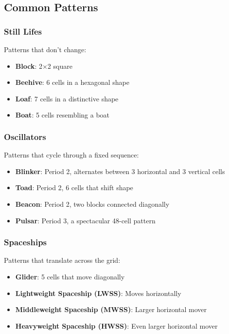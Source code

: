 \documentclass{article}
\begin{document}

\subsection{Common Patterns}

\subsubsection{Still Lifes}
Patterns that don't change:

\begin{itemize}
\item \textbf{Block}: 2×2 square
\item \textbf{Beehive}: 6 cells in a hexagonal shape
\item \textbf{Loaf}: 7 cells in a distinctive shape
\item \textbf{Boat}: 5 cells resembling a boat
\end{itemize}

\subsubsection{Oscillators}
Patterns that cycle through a fixed sequence:

\begin{itemize}
\item \textbf{Blinker}: Period 2, alternates between 3 horizontal and 3 vertical cells
\item \textbf{Toad}: Period 2, 6 cells that shift shape
\item \textbf{Beacon}: Period 2, two blocks connected diagonally
\item \textbf{Pulsar}: Period 3, a spectacular 48-cell pattern
\end{itemize}

\subsubsection{Spaceships}
Patterns that translate across the grid:

\begin{itemize}
\item \textbf{Glider}: 5 cells that move diagonally
\item \textbf{Lightweight Spaceship (LWSS)}: Moves horizontally
\item \textbf{Middleweight Spaceship (MWSS)}: Larger horizontal mover
\item \textbf{Heavyweight Spaceship (HWSS)}: Even larger horizontal mover
\end{itemize}
\end{document}
